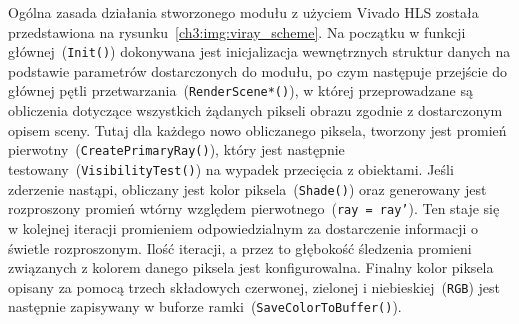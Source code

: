 
Ogólna zasada działania stworzonego modułu z użyciem Vivado HLS została przedstawiona na rysunku~\ref{ch3:img:viray_scheme}. Na początku w funkcji głównej~(\texttt{Init()}) dokonywana jest inicjalizacja wewnętrznych struktur danych na podstawie parametrów dostarczonych do modułu, po czym następuje przejście do głównej pętli przetwarzania~(\texttt{RenderScene*()}), w której przeprowadzane są obliczenia dotyczące wszystkich żądanych pikseli obrazu zgodnie z dostarczonym opisem sceny. Tutaj dla każdego nowo obliczanego piksela, tworzony jest promień pierwotny~(\texttt{CreatePrimaryRay()}), który jest następnie testowany~(\texttt{VisibilityTest()}) na wypadek przecięcia z obiektami. Jeśli zderzenie nastąpi, obliczany jest kolor piksela~(\texttt{Shade()}) oraz generowany jest rozproszony promień wtórny względem pierwotnego~(\texttt{ray = ray'}). Ten staje się w kolejnej iteracji promieniem odpowiedzialnym za dostarczenie informacji o świetle rozproszonym. Ilość iteracji, a przez to głębokość śledzenia promieni związanych z kolorem danego piksela jest konfigurowalna. Finalny kolor piksela opisany za pomocą trzech składowych czerwonej, zielonej i niebieskiej~(\texttt{RGB}) jest następnie zapisywany w buforze ramki~(\texttt{SaveColorToBuffer()}).

